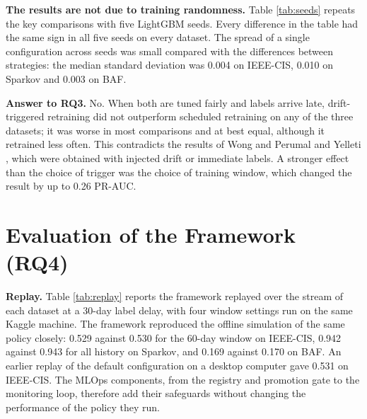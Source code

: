 \textbf{The results are not due to training randomness.} Table \ref{tab:seeds} repeats the key comparisons with five LightGBM seeds. Every difference in the table had the same sign in all five seeds on every dataset. The spread of a single configuration across seeds was small compared with the differences between strategies: the median standard deviation was 0.004 on IEEE-CIS, 0.010 on Sparkov and 0.003 on BAF.

\textbf{Answer to RQ3.} No. When both are tuned fairly and labels arrive late, drift-triggered retraining did not outperform scheduled retraining on any of the three datasets; it was worse in most comparisons and at best equal, although it retrained less often. This contradicts the results of Wong and Perumal \cite{wong2025} and Yelleti \cite{yelleti2025}, which were obtained with injected drift or immediate labels. A stronger effect than the choice of trigger was the choice of training window, which changed the result by up to 0.26 PR-AUC.

\section{Evaluation of the Framework (RQ4)}

\textbf{Replay.} Table \ref{tab:replay} reports the framework replayed over the stream of each dataset at a 30-day label delay, with four window settings run on the same Kaggle machine. The framework reproduced the offline simulation of the same policy closely: 0.529 against 0.530 for the 60-day window on IEEE-CIS, 0.942 against 0.943 for all history on Sparkov, and 0.169 against 0.170 on BAF. An earlier replay of the default configuration on a desktop computer gave 0.531 on IEEE-CIS. The MLOps components, from the registry and promotion gate to the monitoring loop, therefore add their safeguards without changing the performance of the policy they run.

